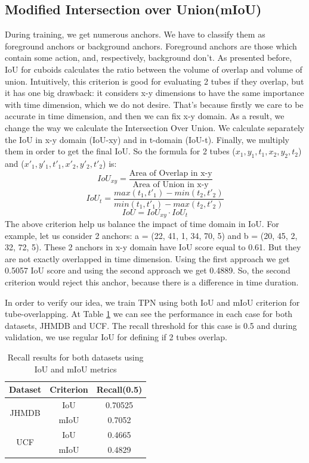 \subsection{Modified Intersection over Union(mIoU)} 
During training, we get numerous anchors. We have to classify them as foreground anchors or
background anchors. Foreground anchors are those which contain some action, and, respectively, background
don't. As presented before, IoU for cuboids calculates the ratio between the volume of overlap and volume of
union.
Intuitively, this criterion is good for evaluating 2 tubes if they overlap, but it has one big drawback:
it considers x-y dimensions to have the same importance with time dimension, which we do not desire. That's because
firstly we care to be accurate in time dimension, and then we can fix x-y domain.
As a result, we change the way we calculate the Intersection Over Union. We calculate separately
the IoU in x-y domain (IoU-xy) and in t-domain (IoU-t). Finally, we multiply them in order to get the final IoU.
So the formula for 2 tubes ($x_1, y_1, t_1, x_2, y_2, t_2$) and ($x'_1, y'_1, t'_1, x'_2, y'_2, t'_2$) is:
\[ IoU_{xy} = \frac{ \text{Area of Overlap in x-y}} { \text{Area of Union in x-y}}  \]
\[ IoU_t = \frac { max(t_1, t'_1) - min(t_2, t'_2)} {min(t_1,t'_1) - max(t_2,t'_2)} \]
\[ IoU = IoU_{xy} \cdot  IoU_t \]
The above criterion help us balance the impact of time domain in IoU. For example, let us consider 2 anchors:
a = (22, 41, 1, 34, 70, 5) and b = (20, 45, 2, 32, 72, 5). These 2 anchors in x-y domain have IoU score equal to 0.61.
But they are not exactly overlapped in time dimension. Using the first approach we get 0.5057 IoU score and using the
second approach we get 0.4889. So, the second criterion would reject this anchor, because there is a difference in time
duration.  \par

In order to verify our idea, we train TPN using both IoU and mIoU criterion for tube-overlapping. At Table \ref{table:iou_miou}
we can see the performance in each case for both datasets, JHMDB and UCF. The recall threshold for this case is 0.5 and during validation,
we use regular IoU for defining if 2 tubes overlap.
\begin{table}[h]
\centering
  \begin{tabular}{|| c | c || c ||}
    \hline
    \textbf{Dataset} & \textbf{Criterion} & \textbf{Recall(0.5)} \\
    \hline  \hline
    \multirow{2}{4em}{JHMDB} & IoU & 0.70525 \\
    \cline{2-3}
    {} & mIoU & 0.7052 \\
    \hline
    \multirow{2}{4em}{UCF} & IoU & 0.4665 \\
    \cline{2-3}
    {} & mIoU & 0.4829 \\
    \hline      
  \end{tabular}
  \caption{Recall results for both datasets using IoU and mIoU metrics}
  \label{table:iou_miou}
\end{table}

